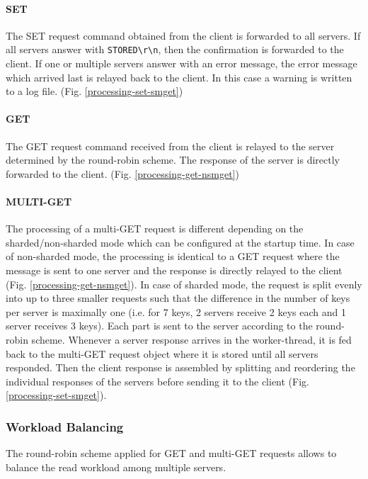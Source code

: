 \documentclass[report.tex]{subfiles}
\begin{document}
\paragraph{SET} The SET request command obtained from the client is forwarded to all servers. If all servers answer with \texttt{STORED\textbackslash r\textbackslash n}, then the confirmation is forwarded to the client. 
If one or multiple servers answer with an error message, the error message which arrived last is relayed back to the client. 
In this case a warning is written to a log file. (Fig. \ref{processing-set-smget})

\paragraph{GET} The GET request command received from the client is relayed to the server determined by the round-robin scheme.
The response of the server is directly forwarded to the client. (Fig. \ref{processing-get-nsmget})

\paragraph{MULTI-GET} The processing of a multi-GET request is different depending on the sharded/non-sharded mode which can be configured at the startup time. In case of non-sharded mode, the processing is identical to a GET request where the message is sent to one server and the response is directly relayed to the client (Fig. \ref{processing-get-nsmget}). In case of sharded mode, the request is split evenly into up to three smaller requests such that the difference in the number of keys per server is maximally one (i.e. for 7 keys, 2 servers receive 2 keys each and 1 server receives 3 keys).
Each part is sent to the server according to the round-robin scheme. Whenever a server response arrives in the worker-thread, it is fed back to the multi-GET request object where it is stored until all servers responded. Then the client response is assembled by splitting and reordering the individual responses of the servers before sending it to the client (Fig. \ref{processing-set-smget}).

\subsubsection{Workload Balancing}\label{workload-balancing}
The round-robin scheme applied for GET and multi-GET requests allows to balance the read workload among multiple servers.
\end{document}
